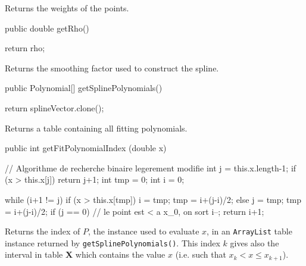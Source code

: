 \begin{tabb}   Returns the weights of the points.
\end{tabb}
\begin{htmlonly}
\end{htmlonly}
\begin{code}

   public double getRho()\begin{hide} {
      return rho;
   }\end{hide}
\end{code}
\begin{tabb}   Returns the smoothing factor used to construct the spline.
\end{tabb}
\begin{htmlonly}
\end{htmlonly}
\begin{code}

   public Polynomial[] getSplinePolynomials()\begin{hide} {
      return splineVector.clone();
   }\end{hide}
\end{code}
\begin{tabb}
   Returns a table containing all fitting polynomials.
\end{tabb}
\begin{htmlonly}
\end{htmlonly}
\begin{code}

   public int getFitPolynomialIndex (double x)\begin{hide} {
      // Algorithme de recherche binaire legerement modifie
      int j = this.x.length-1;
      if (x > this.x[j])
         return j+1;
      int tmp = 0;
      int i = 0;

      while (i+1 != j) {
         if (x > this.x[tmp]) {
            i = tmp;
            tmp = i+(j-i)/2;
         } else {
            j = tmp;
            tmp = i+(j-i)/2;
         }
         if (j == 0) // le point est < a x_0, on sort
            i--;
      }
      return i+1;
   }\end{hide}
\end{code}
\begin{tabb}
   Returns the index of $P$, the  instance used to evaluate
    $x$, in an \texttt{ArrayList} table instance returned by
  \texttt{getSplinePolynomials()}. This index $k$ gives also the interval in
    table \textbf{X} which contains the value $x$
   (i.e. such that $x_k < x \leq x_{k+1}$).
\end{tabb}
